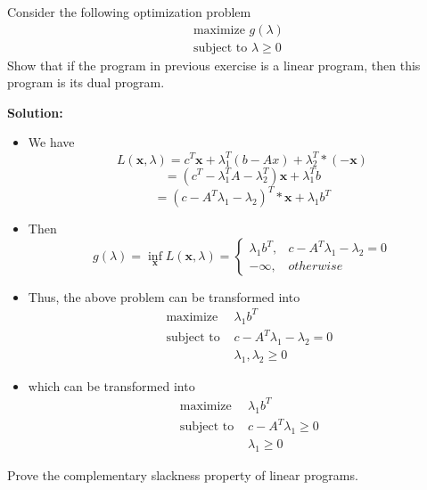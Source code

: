 \documentclass{article}
\newcounter{exercise}
\newcommand{\<}{
    \langle}
\renewcommand{\>}{
    \rangle}
\begin{document}
{	
\begin{exercise}
	Consider the following optimization problem
	$$\begin{aligned}
	&\text { maximize } g(\lambda)\\
	&\text { subject to } \lambda \ge 0
	\end{aligned}$$
	Show that if the program in previous exercise is a linear program, then this program is its dual program.
\end{exercise}

\textbf{Solution:}
\begin{itemize}
    \item We have 
		$$ L(\mathbf{x}, \lambda) = c^{T}\mathbf{x}+\lambda_{1}^{T}(b-Ax)+\lambda_{2}^{T}*(-\mathbf{x}) $$
		$$ = (c^{T}-\lambda_{1}^{T}A-\lambda_{2}^{T})\mathbf{x}+\lambda_{1}^{T}b$$
		$$ =(c-A^{T}\lambda_{1}-\lambda_{2})^{T}*\mathbf{x}+\lambda_{1}b^{T} $$
    \item Then 
		\begin{equation} g(\lambda)=\inf _{\mathbf{x}} L(\mathbf{x}, \lambda) =
		\begin{cases} 
			\lambda_{1}b^{T}, & c-A^{T}\lambda_{1}-\lambda_{2}=0 \\ 
			-\infty, &  otherwise
		\end{cases} 
		\end{equation}
		\item Thus, the above problem can be transformed into 
		$$\begin{aligned}
		&\text { maximize } &\lambda_{1}b^{T}\\
		&\text { subject to }& c-A^{T}\lambda_{1}-\lambda_{2}=0\\
		& & \lambda_{1},\lambda_{2} \geq 0
		\end{aligned}$$
		\item which can be transformed into
		$$\begin{aligned}
			&\text { maximize } &\lambda_{1}b^{T}\\
			&\text { subject to }& c-A^{T}\lambda_{1}\geq 0\\
			& & \lambda_{1}\geq 0
			\end{aligned}$$
\end{itemize}
\newpage




\begin{exercise}
	Prove the complementary slackness property of linear programs.
\end{exercise}

}
\end{document}
